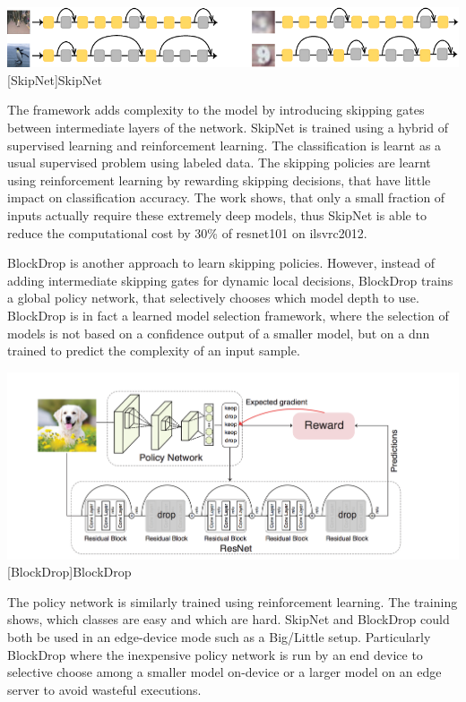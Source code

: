 \begin{enumdescript}
	\begin{minipage}[t]{\linewidth}    
		\centering                          
		\includegraphics[width=.8\linewidth]{figures/models/skipnet}
		[SkipNet]{SkipNet}
	\end{minipage}
	
	The framework adds complexity to the model by introducing skipping gates between intermediate layers of the network. SkipNet is trained using a hybrid of supervised learning and reinforcement learning. The classification is learnt as a usual supervised problem using labeled data. The skipping policies are learnt using reinforcement learning by rewarding skipping decisions, that have little impact on classification accuracy. The work shows, that only a small fraction of inputs actually require these extremely deep models, thus SkipNet is able to reduce the computational cost by 30\% of \gls{resnet}101 on \gls{ilsvrc2012}. 
	
	BlockDrop \cite{wu_blockdrop:_2017} is another approach to learn skipping policies. However, instead of adding intermediate skipping gates for dynamic local decisions, BlockDrop trains a global policy network, that selectively chooses which model depth to use. BlockDrop is in fact a learned model selection framework, where the selection of models is not based on a confidence output of a smaller model, but on a \gls{dnn} trained to predict the complexity of an input sample. 
	
	
	\begin{minipage}[t]{\linewidth}    
		\centering
		\includegraphics[width=\linewidth]{figures/models/blockdrop}
		[BlockDrop]{BlockDrop}
	\end{minipage}
	
	The policy network is similarly trained using reinforcement learning. The training shows, which classes are easy and which are hard. SkipNet and BlockDrop could both be used in an edge-device mode such as a Big/Little \cite{park_big/little_2015} setup. Particularly BlockDrop where the inexpensive policy network is run by an end device to selective choose among a smaller model on-device or a larger model on an edge server to avoid wasteful executions.


\end{enumdescript}
